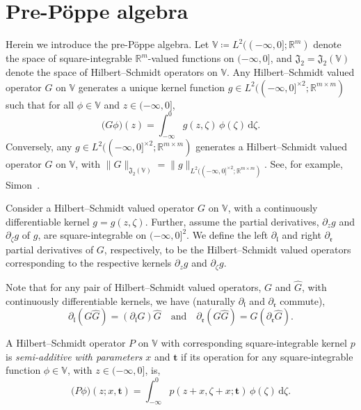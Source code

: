 \documentclass[5p,twocolumn]{elsarticle}
\newcommand*{\R}{\mathbb R}
\newcommand*{\pa}{{\partial}}
\newcommand*{\rd}{{\mathrm{d}}}
\newcommand*{\Vb}{\mathbb V}
\newcommand*{\tbf}{\boldsymbol{t}}
\newcommand*{\el}{\mathfrak l}
\newcommand*{\rl}{\mathfrak r}
\begin{document}
\section{Pre-P\"oppe algebra}\label{sec:Poppealg}
Herein we introduce the pre-P\"oppe algebra. 
Let $\mathbb V\coloneqq L^2((-\infty,0];\R^m)$ denote the space of square-integrable $\R^m$-valued functions on $(-\infty,0]$,
and $\mathfrak J_2=\mathfrak J_2(\Vb)$ denote the space of Hilbert--Schmidt operators on $\mathbb V$.
Any Hilbert--Schmidt valued operator $G$ on $\Vb$ generates a unique kernel function $g\in L^2((-\infty,0]^{\times2};\R^{m\times m})$
such that for all $\phi\in\Vb$ and $z\in(-\infty,0]$,
\begin{equation*}
\bigl(G\phi\bigr)(z)=\int_{-\infty}^0 g(z,\zeta)\,\phi(\zeta)\,\rd\zeta.
\end{equation*}
Conversely, any $g\in L^2((-\infty,0]^{\times2};\R^{m\times m})$ generates a Hilbert--Schmidt valued operator $G$ on $\Vb$,
with $\|G\|_{\mathfrak J_2(\Vb)}=\|g\|_{L^2((-\infty,0]^{\times2};\R^{m\times m})}$. See, for example, Simon~\cite{Simon}.
%
\begin{definition}
  Consider a Hilbert--Schmidt valued operator $G$ on $\Vb$, with a continuously differentiable kernel $g=g(z,\zeta)$.
  Further, assume the partial derivatives, $\pa_z g$ and $\pa_\zeta g$ of $g$, are square-integrable on $(-\infty,0]^2$.
  We define the left $\pa_\el$ and right $\pa_\rl$ partial derivatives of $G$, respectively,
  to be the Hilbert--Schmidt valued operators corresponding to the respective kernels $\pa_z g$ and $\pa_\zeta g$.
\end{definition}
%
\begin{remark}
  Note that for any pair of Hilbert--Schmidt valued operators, $G$ and $\hat{G}$, with continuously differentiable kernels, we have (naturally $\pa_\el$ and $\pa_\rl$ commute),
  \begin{equation}
   \pa_\el(G\hat{G})=(\pa_\el G)\hat{G}\quad\text{and}\quad \pa_\rl(G\hat{G})=G(\pa_\rl\hat{G}).\label{eq:leftandrightderivs}
  \end{equation}
\end{remark}
%
\begin{definition}\label{def:semiadd}
  A Hilbert--Schmidt operator $P$ on $\Vb$ with corresponding square-integrable kernel $p$ is \emph{semi-additive with parameters} $x$ and $\tbf$
  if its operation for any square-integrable function $\phi\in\Vb$, with $z\in(-\infty,0]$, is,
  \begin{equation*}
     \bigl(P\phi\bigr)(z;x,\tbf)=\int_{-\infty}^0 p(z+x,\zeta+x;\tbf)\,\phi(\zeta)\,\rd\zeta.
  \end{equation*}
\end{definition}
\end{document}
